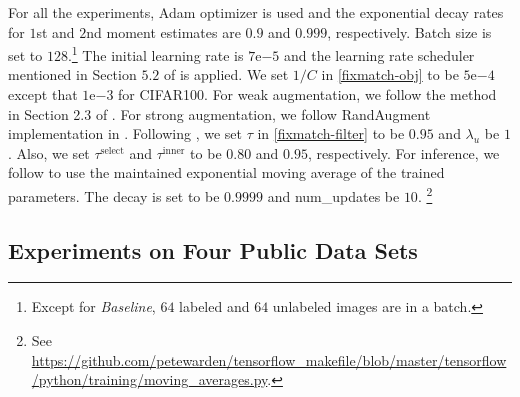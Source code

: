 \documentclass{article}
\begin{document}
For all the experiments, Adam \cite{DK14a} optimizer is used and the exponential decay rates for $1$st and $2$nd moment estimates are $0.9$ and $0.999$, respectively.
Batch size is set to $128$.\footnote{
Except for {\sl Baseline}, $64$ labeled and $64$ unlabeled images are in a batch.
}
The initial learning rate is $7\mathrm{e}{-5}$ and the learning rate scheduler mentioned in Section $5.2$ of \cite{MT19a} is applied.
We set $1/C$ in \eqref{fixmatch-obj} to be $5\mathrm{e}{-4}$ except that $1\mathrm{e}{-3}$ for {\sf CIFAR100}.
For weak augmentation, we follow the method in Section 2.3 of \cite{KS20a}.
For strong augmentation, we follow RandAugment implementation in \cite{EC20a}.
Following \cite{KS20a}, we set $\tau$ in \eqref{fixmatch-filter} to be $0.95$ and $\lambda_u$ be $1$.
Also, we set $\tau^{\text{select}}$ and $\tau^{\text{inner}}$ to be $0.80$ and $0.95$, respectively.
For inference, we follow \cite{KS20a} to use the maintained exponential moving average of the trained parameters.
The decay is set to be $0.9999$ and num\_updates be $10$.
\footnote{
    See \url{https://github.com/petewarden/tensorflow_makefile/blob/master/tensorflow/python/training/moving_averages.py}.
}

\subsection{Experiments on Four Public Data Sets}
\label{subsec:exp-public}
\end{document}
